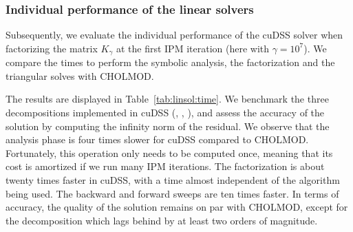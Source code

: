\subsubsection{Individual performance of the linear solvers}
Subsequently, we evaluate the individual performance of the cuDSS solver when factorizing the matrix $K_{\gamma}$ at the first IPM iteration (here with $\gamma = 10^7$).
We compare the times to perform the symbolic analysis,
the factorization and the triangular solves with CHOLMOD.

The results are displayed in Table~\ref{tab:linsol:time}.
We benchmark the three decompositions implemented in cuDSS (\llt, \ldlt, \lu), and assess the accuracy of the solution by computing the infinity norm of the residual.
We observe that the analysis phase is four times slower for cuDSS compared to CHOLMOD.
Fortunately, this operation only needs to be computed once, meaning that its cost is amortized if we run many IPM iterations.
The factorization is about twenty times faster in cuDSS, with a time almost independent of the algorithm being used.
The backward and forward sweeps are ten times faster.
In terms of accuracy, the quality of the solution remains on par with CHOLMOD, except for the \ldlt decomposition which lags behind by at least two orders of magnitude.



